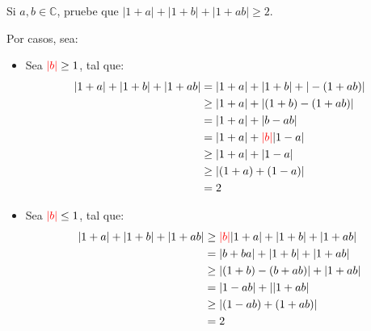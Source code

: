 





\begin{problema}
    Si $a, b \in \mathbb{C}$, pruebe que $|1+a|+|1+b|+|1+a b| \geq 2$.
    \begin{sol}
        Por casos, sea: 

        \begin{itemize}
            \item Sea $\textcolor{red}{|b|}\geq 1$, tal que: 
            \begin{align*}
                |1+a|+|1+b|+|1+a b| &= |1+a| + |1+b|+|-(1+ab)|\\
                                    &\geq |1+a| + \left|(1+b)-(1+ab)\right|\\
                                    &= |1+a|+ |b-ab|\\
                                    &= |1+a| + \textcolor{red}{|b|}|1-a|\\
                                    &\geq |1+a| + |1-a|\\
                                    &\geq |(1+a)+(1-a)| \\
                                    &= 2
            \end{align*}
            \item Sea $\textcolor{red}{|b|}\leq 1$, tal que:
            \begin{align*}
                |1+a|+|1+b|+|1+a b| &\geq \textcolor{red}{|b|}|1+a|+|1+b|+|1+ab|\\
                                    &= |b+ba|+|1+b|+|1+ab|\\
                                    &\geq |(1+b)-(b+ab)|+|1+ab|\\
                                    &= |1-ab|+||1+ab|\\
                                    &\geq |(1-ab)+(1+ab)|\\
                                    &= 2
            \end{align*}
        \end{itemize}
        
    \end{sol}
\end{problema}

